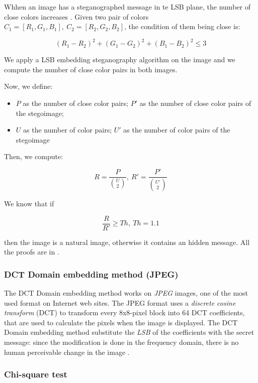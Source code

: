 \documentclass[../../main.tex]{subfiles}
\begin{document}
    Whhen an image has a steganographed message in te LSB plane, the number of
    close colors increases \cite{detecting-lsb-steganography}. Given two pair of
    colors $C_1=[R_1,G_1,B_1],\ C_2=[R_2,G_2,B_2]$, the condition of them being
    close is:

    \[ (R_1-R_2)^2+(G_1-G_2)^2+(B_1-B_2)^2 \leq 3 \]

    We apply a LSB embedding steganography algorithm on the image and we compute
    the number of close color pairs in both images.

    Now, we define:

    \begin{itemize}
        \item $P$ as the number of close color pairs; $P'$ as the number of
              close color pairs of the stegoimage;
        \item $U$ as the number of color pairs; $U'$ as the number of color
              pairs of the stegoimage
    \end{itemize}

    Then, we compute:

    \[ R = \frac{P}{\binom{U}{2}},\ R' = \frac{P'}{\binom{U'}{2}} \]

    We know that if

    \[ \frac{R}{R'} \geq Th,\ Th = 1.1 \]

    \noindent then the image is a natural image, otherwise it contains an hidden
    message. All the proofs are in \cite{detecting-lsb-steganography}.

    \subsubsection{DCT Domain embedding method (JPEG)}
    The DCT Domain embedding method works on \emph{JPEG} images, one of the most
    used format on Internet web sites.
    The JPEG format uses a \emph{discrete cosine transform} (DCT) to transform
    every 8x8-pixel block into 64 DCT coefficients, that are used to calculate
    the pixels when the image is displayed.
    The DCT Domain embedding method substitute the \emph{LSB} of the
    coefficients with the secret message: since the modification is done in the
    frequency domain, there is no human perceivable change in the image
    \cite{jpeg-image-internet}.

    \subsubsection{Chi-square test}
\end{document}
